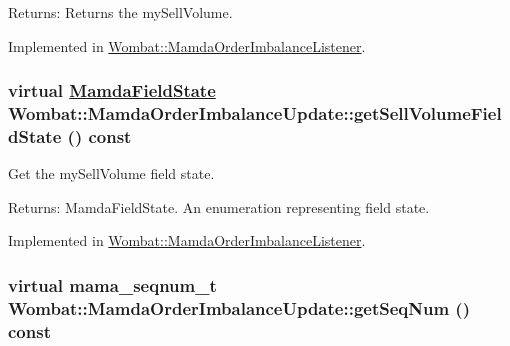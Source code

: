 \begin{Desc}
\item[Returns:]Returns the my\-Sell\-Volume. \end{Desc}


Implemented in \hyperlink{classWombat_1_1MamdaOrderImbalanceListener_fce0392a0c33cf57e534908cb29cd10e}{Wombat::Mamda\-Order\-Imbalance\-Listener}.\hypertarget{classWombat_1_1MamdaOrderImbalanceUpdate_953bff5b9c9edb2a9e4c1ded09ac9044}{
\subsubsection[getSellVolumeFieldState]{\setlength{\rightskip}{0pt plus 5cm}virtual \hyperlink{namespaceWombat_93aac974f2ab713554fd12a1fa3b7d2a}{Mamda\-Field\-State} Wombat::Mamda\-Order\-Imbalance\-Update::get\-Sell\-Volume\-Field\-State () const}}
\label{classWombat_1_1MamdaOrderImbalanceUpdate_953bff5b9c9edb2a9e4c1ded09ac9044}


Get the my\-Sell\-Volume field state. 

\begin{Desc}
\item[Returns:]Mamda\-Field\-State. An enumeration representing field state. \end{Desc}


Implemented in \hyperlink{classWombat_1_1MamdaOrderImbalanceListener_83655805e56c6a77ef48d0b6a5129f7b}{Wombat::Mamda\-Order\-Imbalance\-Listener}.\hypertarget{classWombat_1_1MamdaOrderImbalanceUpdate_52b8b172678b398d757cd5b3408606c2}{
\subsubsection[getSeqNum]{\setlength{\rightskip}{0pt plus 5cm}virtual mama\_\-seqnum\_\-t Wombat::Mamda\-Order\-Imbalance\-Update::get\-Seq\-Num () const}}
\label{classWombat_1_1MamdaOrderImbalanceUpdate_52b8b172678b398d757cd5b3408606c2}


